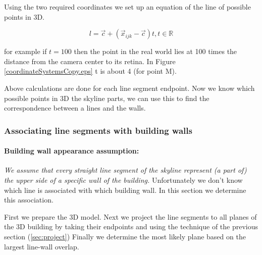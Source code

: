

	Using the two required coordinates we set up an equation of the
	line of possible points in 3D.  

	 \[ l = \vec{c} + (\vec{x}_{ijk}-\vec{c})t, t \in \mathbb{R} \]

	for example if $t=100$ then the point in the real world lies at 100 times
		the distance from the camera center to its retina.
	In Figure \ref{coordinateSystemsCopy.eps} t is about 4 (for point M).

	Above calculations are done for each line segment endpoint.
	Now we know which possible points in 3D the skyline parts,
	we can use this to find the correspondence between a lines and the walls.


\subsubsection{Associating line segments with building walls}
	\paragraph{Building wall appearance assumption:}
	\emph{We assume that every straight line segment of the skyline represent (a part of) the upper side of a specific wall of the building.}
	Unfortunately we don't know which line is associated with which building
	wall. In this section we determine this association.

	First we prepare the 3D model. Next we project the line segments to all planes of the 3D building by
	taking their endpoints and using the technique of the previous section (\ref{sec:project})
	Finally we determine the most likely plane based on the largest line-wall overlap. 

